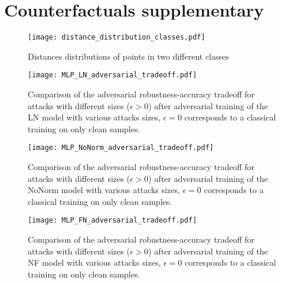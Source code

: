 \chapter{Counterfactuals supplementary}\label{chap:interpretability_appendix}

\begin{figure}[htbp]
	\centering
	\begin{subcaptiongroup}
		\texttt{[image: distance\_distribution\_classes.pdf]}
		\label{fig:dist_cls_distibutionL1}
		\label{fig:dist_cls_distibutionL2}
		\label{fig:dist_cls_distibutionLinf}
	\end{subcaptiongroup}
	\caption{Distances distributions of points in two different classes}\label{fig:dist_cls_distibution}
\end{figure}

\begin{figure}[htbp]
	\centering
	\texttt{[image: MLP\_LN\_adversarial\_tradeoff.pdf]}
	\caption[ LN adversarial robustness-accuracy tradeoff]{Comparison of the adversarial robustness-accuracy tradeoff for  attacks with different sizes (\(\epsilon > 0\)) after adversarial training of the  LN model with various  attacks sizes, \(\epsilon = 0\) corresponds to a classical training on only clean samples. }\label{fig:mlp_ln_adv_tradeoff}
\end{figure}

\begin{figure}[htbp]
	\centering
	\texttt{[image: MLP\_NoNorm\_adversarial\_tradeoff.pdf]}
	\caption[ NoNorm adversarial robustness-accuracy tradeoff]{Comparison of the adversarial robustness-accuracy tradeoff for  attacks with different sizes (\(\epsilon > 0\)) after adversarial training of the  NoNorm model with various  attacks sizes, \(\epsilon = 0\) corresponds to a classical training on only clean samples. }\label{fig:mlp_nonorm_adv_tradeoff}
\end{figure}

\begin{figure}[htbp]
	\centering
	\texttt{[image: MLP\_FN\_adversarial\_tradeoff.pdf]}
	\caption[ NF adversarial robustness-accuracy tradeoff]{Comparison of the adversarial robustness-accuracy tradeoff for  attacks with different sizes (\(\epsilon > 0\)) after adversarial training of the  NF model with various  attacks sizes, \(\epsilon = 0\) corresponds to a classical training on only clean samples. }\label{fig:mlp_fn_adv_tradeoff}
\end{figure}

